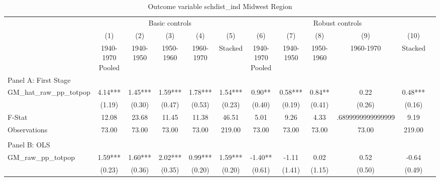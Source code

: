  \begin{table}[htbp]\centering {} \begin{threeparttable} \caption{Outcome variable schdist\_ind Midwest Region} \begin{tabular}{l*{11}{c}} \toprule
          &\multicolumn{5}{c}{Basic controls}                                   &\multicolumn{5}{c}{Robust controls}                                  \\\cmidrule(lr){2-6}\cmidrule(lr){7-11}
          &\multicolumn{1}{c}{(1)}&\multicolumn{1}{c}{(2)}&\multicolumn{1}{c}{(3)}&\multicolumn{1}{c}{(4)}&\multicolumn{1}{c}{(5)}&\multicolumn{1}{c}{(6)}&\multicolumn{1}{c}{(7)}&\multicolumn{1}{c}{(8)}&\multicolumn{1}{c}{(9)}&\multicolumn{1}{c}{(10)}\\
          &\multicolumn{1}{c}{1940-1970 Pooled}&\multicolumn{1}{c}{1940-1950}&\multicolumn{1}{c}{1950-1960}&\multicolumn{1}{c}{1960-1970}&\multicolumn{1}{c}{Stacked}&\multicolumn{1}{c}{1940-1970 Pooled}&\multicolumn{1}{c}{1940-1950}&\multicolumn{1}{c}{1950-1960}&\multicolumn{1}{c}{1960-1970}&\multicolumn{1}{c}{Stacked}\\
\cmidrule(lr){1-11}
\multicolumn{10}{l}{Panel A: First Stage}\\
\cmidrule(lr){1-11}
GM\_hat\_raw\_pp\_totpop&      4.14***&      1.45***&      1.59***&      1.78***&      1.54***&      0.90** &      0.58***&      0.84** &      0.22   &      0.48***\\
          &    (1.19)   &    (0.30)   &    (0.47)   &    (0.53)   &    (0.23)   &    (0.40)   &    (0.19)   &    (0.41)   &    (0.26)   &    (0.16)   \\
\midrule
F-Stat    &     12.08   &     23.68   &     11.45   &     11.38   &     46.51   &      5.01   &      9.26   &      4.33   &.6899999999999999   &      9.19   \\
Observations&     73.00   &     73.00   &     73.00   &     73.00   &    219.00   &     73.00   &     73.00   &     73.00   &     73.00   &    219.00   \\
\cmidrule[\heavyrulewidth](lr){1-11} \\ \cmidrule[\heavyrulewidth](lr){1-11}
\multicolumn{10}{l}{Panel B: OLS}\\
\cmidrule(lr){1-11}
GM\_raw\_pp\_totpop&      1.59***&      1.60***&      2.02***&      0.99***&      1.59***&     -1.40** &     -1.11   &      0.02   &      0.52   &     -0.64   \\
          &    (0.23)   &    (0.36)   &    (0.35)   &    (0.20)   &    (0.20)   &    (0.61)   &    (1.41)   &    (1.15)   &    (0.50)   &    (0.49)   \\

\end{tabular}
\end{threeparttable}
\end{table}
